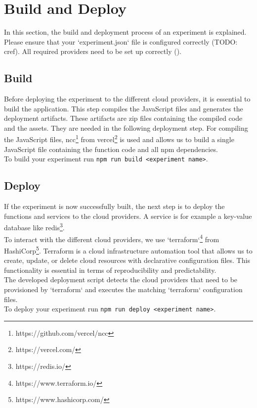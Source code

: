 \documentclass[../main.tex]{subfiles}
\begin{document}
\section{Build and Deploy}\label{sec:buildanddeploy}
In this section, the build and deployment process of an experiment is explained. Please ensure that your `experiment.json` file is configured correctly (TODO: cref). All required providers need to be set up correctly ().

\subsection{Build}\label{sec:build}
Before deploying the experiment to the different cloud providers, it is essential to build the application. This step compiles the JavaScript files and generates the deployment artifacts. These artifacts are zip files containing the compiled code and the assets. They are needed in the following deployment step. For compiling the JavaScript files, ncc\footnote{https://github.com/vercel/ncc} from vercel\footnote{https://vercel.com/} is used and allows us to build a single JavaScript file containing the function code and all npm dependencies.\\
To build your experiment run \texttt{npm run build <experiment name>}.

\subsection{Deploy}\label{sec:deploy}
If the experiment is now successfully built, the next step is to deploy the functions and services to the cloud providers. A service is for example a key-value database like redis\footnote{https://redis.io/}. \\
To interact with the different cloud providers, we use `terraform`\footnote{https://www.terraform.io/} from HashiCorp\footnote{https://www.hashicorp.com/}. Terraform is a cloud infrastructure automation tool that allows us to create, update, or delete cloud resources with declarative configuration files. This functionality is essential in terms of reproducibility and predictability.\\
The developed deployment script detects the cloud providers that need to be provisioned by `terraform` and executes the matching `terraform` configuration files.\\
To deploy your experiment run \texttt{npm run deploy <experiment name>}.\\
\end{document}
